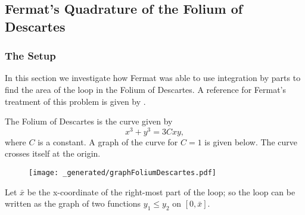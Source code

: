 \subsection{Fermat's Quadrature of the Folium of Descartes}

\subsubsection*{The Setup}

In this section we investigate how Fermat was able to use integration by parts to find the area of the
loop in the Folium of Descartes. A reference for Fermat's treatment of this problem is given by \cite{fermatTreatise}. 

The Folium of Descartes is the curve given by
\begin{equation}
x^3 + y^3 = 3C xy,
\end{equation}
where \(C\) is a constant. A graph of the curve for \(C = 1\) is given below. The curve crosses itself
at the origin.

\begin{figure}[h]
\centering
\texttt{[image: \_generated/graphFoliumDescartes.pdf]}
\end{figure}

Let \(\bar x\) be the x-coordinate of the right-most part of the loop; so the loop can be written as the graph
of two functions \(y_1 \leq y_2\) on \([0, \bar x]\).

